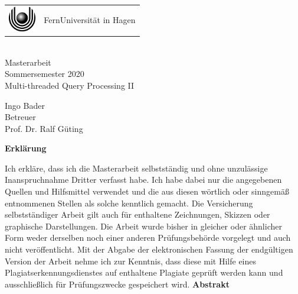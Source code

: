 \documentclass[a4paper,12pt,twoside]{article}
\newcommand{\Theme}{Multi-threaded Query Processing II}
\newcommand{\Name}{Ingo Bader}
\begin{document}
\thispagestyle{empty}
\pagestyle{empty}

\begin{center}
\begin{huge}
\vspace*{3cm}
    \begin{tabular}{m{1.2cm}@{\ \ }m{9cm}}
      \includegraphics[width=1.2cm]{logo.eps} & {FernUniversität in Hagen}
    \end{tabular}
    \\
    \vspace*{3cm}
   Masterarbeit \\
   Sommersemester 2020 \\[2em]
   \glqq{} \Theme \grqq{} \\[2cm]
\end{huge}
\begin{large}
	\Name \\[3cm]
   	Betreuer \\[1em]
   	Prof. Dr. Ralf Güting 
\end{large}
\end{center}

\clearpage
\textbf{Erklärung}

Ich erkläre, dass ich die Masterarbeit selbstständig und ohne unzulässige Inanspruchnahme Dritter verfasst habe. Ich habe dabei nur die angegebenen Quellen und Hilfsmittel verwendet und die aus diesen wörtlich oder sinngemäß entnommenen Stellen als solche kenntlich gemacht. Die Versicherung selbstständiger Arbeit gilt auch für enthaltene Zeichnungen, Skizzen oder graphische Darstellungen. Die Arbeit wurde bisher in gleicher oder ähnlicher Form weder derselben noch einer anderen Prüfungsbehörde vorgelegt und auch nicht veröffentlicht. Mit der Abgabe der elektronischen Fassung der endgültigen Version der Arbeit nehme ich zur Kenntnis, dass diese mit Hilfe eines Plagiatserkennungsdienstes auf enthaltene Plagiate geprüft werden kann und ausschließlich für Prüfungszwecke gespeichert wird.
\clearpage
\textbf{Abstrakt}
\end{document}
